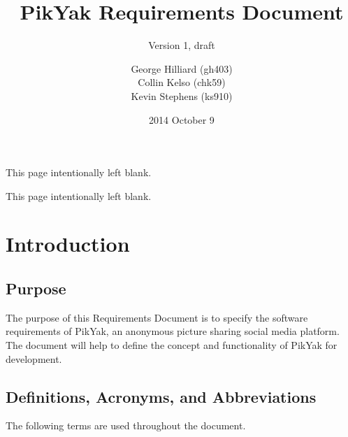 \documentclass[11pt]{scrartcl}
\title{PikYak Requirements Document}
\subtitle{Version 1, draft}
\author{
    George Hilliard (gh403) \\
    Collin Kelso (chk59) \\
    Kevin Stephens (ks910)
}
\date{2014 October 9}
\newcommand*{\blankpage}{%
\clearpage
\vspace*{\fill}
\centerline{This page intentionally left blank.}
\vspace{\fill}
\clearpage}
\let\stdsection\section
\renewcommand\section{\newpage\stdsection}
\begin{document}

\maketitle

\blankpage

\tableofcontents

\blankpage


\section{Introduction}
    \subsection{Purpose}
        The purpose of this Requirements Document is to specify the software requirements of PikYak, an anonymous picture sharing social media platform.
        The document will help to define the concept and functionality of PikYak for development.

    \subsection{Definitions, Acronyms, and Abbreviations}
        The following terms are used throughout the document.
\end{document}
